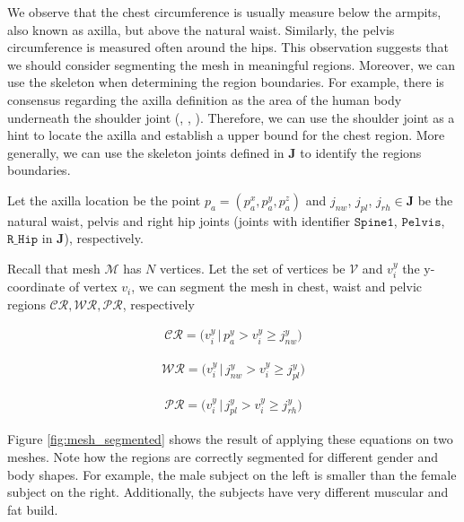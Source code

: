\documentclass[runningheads, orivec]{llncs}
\begin{document}
We observe that the chest circumference is usually measure below the armpits, 
also known as axilla, but above the natural waist. Similarly, the pelvis 
circumference is measured often around the hips. This observation suggests that 
we should consider segmenting the mesh in meaningful regions. Moreover, we can 
use the skeleton when determining the region boundaries. For 
example, there is consensus regarding the axilla 
definition as the area of the human body underneath the shoulder joint 
(\cite{MeSH.axilla}, \cite{FMA.axilla}, \cite{TA.axilla}). Therefore, we can 
use the shoulder joint as a hint to locate the axilla and establish a upper 
bound for the chest region. More generally, we can use the 
skeleton joints defined in $\mathbf{J}$ to identify the regions boundaries.

Let the axilla location be the point $p_a = (p^x_a, p^y_a, p^z_a)$ and 
$j_{nw}$, $j_{pl}$, 
$j_{rh} \in \mathbf{J}$ be the natural waist, pelvis and right hip joints 
(joints with identifier $\mathtt{Spine1}$, $\mathtt{Pelvis}$, $\mathtt{R\_Hip}$ 
in 
$\mathbf{J}$), respectively.

Recall that mesh $\mathcal{M}$ has $N$ vertices. Let the set of vertices be 
$\mathcal{V}$ and $v^y_i$ the y-coordinate of vertex $v_i$, we can 
segment the 
mesh in chest, waist and pelvic regions 
$\mathcal{CR}, \mathcal{WR}, \mathcal{PR}$, respectively

\begin{align}\label{eq:cr}
\mathcal{CR} = \big(v^y_i \, | \, p^y_a > v^y_i \geq j^y_{nw} \big)
\end{align}

\begin{align}\label{eq:wr}
\mathcal{WR} = \big(v^y_i \, | \, j^y_{nw} > v^y_i \geq j^y_{pl}\big)
\end{align}

\begin{align}\label{eq:pr}
\mathcal{PR} = \big(v^y_i \, | \, j^y_{pl} > v^y_i \geq j^y_{rh}\big)
\end{align}

Figure \ref{fig:mesh_segmented} shows the result of applying these equations on 
two meshes. Note how the regions are correctly segmented for different gender 
and body shapes. For example, the male subject on the left is smaller than the 
female subject on the right. Additionally, the subjects have very different 
muscular and fat build.
\end{document}
